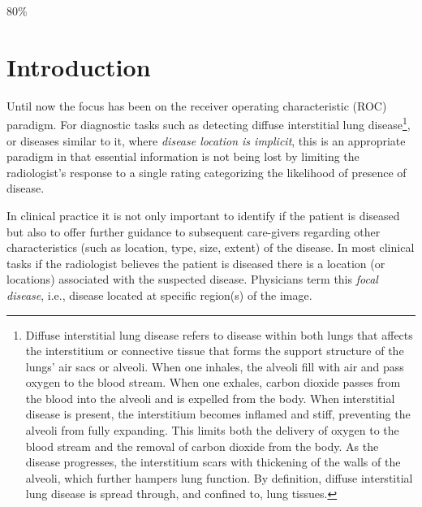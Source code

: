 \documentclass[
]{book}
\begin{document}
80\%

\hypertarget{froc-paradigm-intro}{%
\section{Introduction}\label{froc-paradigm-intro}}

Until now the focus has been on the receiver operating characteristic (ROC) paradigm. For diagnostic tasks such as detecting diffuse interstitial lung disease\footnote{Diffuse interstitial lung disease refers to disease within both lungs that affects the interstitium or connective tissue that forms the support structure of the lungs' air sacs or alveoli. When one inhales, the alveoli fill with air and pass oxygen to the blood stream. When one exhales, carbon dioxide passes from the blood into the alveoli and is expelled from the body. When interstitial disease is present, the interstitium becomes inflamed and stiff, preventing the alveoli from fully expanding. This limits both the delivery of oxygen to the blood stream and the removal of carbon dioxide from the body. As the disease progresses, the interstitium scars with thickening of the walls of the alveoli, which further hampers lung function. By definition, diffuse interstitial lung disease is spread through, and confined to, lung tissues.}, or diseases similar to it, where \emph{disease location is implicit}, this is an appropriate paradigm in that essential information is not being lost by limiting the radiologist's response to a single rating categorizing the likelihood of presence of disease.

In clinical practice it is not only important to identify if the patient is diseased but also to offer further guidance to subsequent care-givers regarding other characteristics (such as location, type, size, extent) of the disease. In most clinical tasks if the radiologist believes the patient is diseased there is a location (or locations) associated with the suspected disease. Physicians term this \emph{focal disease}, i.e., disease located at specific region(s) of the image.
\end{document}

